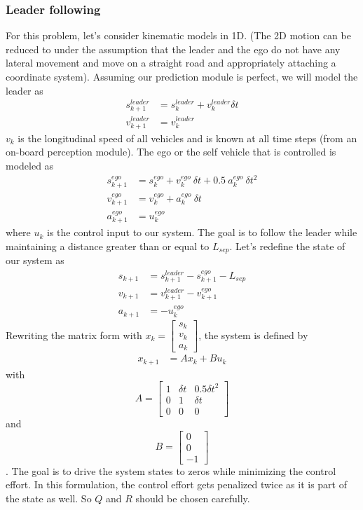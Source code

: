 \subsubsection{Leader following}
For this problem, let's consider kinematic models in 1D. (The 2D motion can be reduced to under the assumption that the leader and the ego do not have any lateral movement and move on a straight road and appropriately attaching a coordinate system). Assuming our prediction module is perfect, we will model the leader as
\begin{align}
    s_{k+1}^{leader} &= s_{k}^{leader} + v_{k}^{leader} \delta t \\
    v_{k+1}^{leader} &= v_{k}^{leader}
\end{align}
$v_{k}$ is the longitudinal speed of all vehicles and is known at all time steps (from an on-board perception module).
The ego or the self vehicle that is controlled is modeled as
\begin{align}
    s_{k+1}^{ego} &= s_{k}^{ego} + v_{k}^{ego}~\delta t + 0.5~a_{k}^{ego}~\delta t^2 \\
    v_{k+1}^{ego} &= v_{k}^{ego} + a_{k}^{ego}~\delta t \\
    a_{k+1}^{ego} &= u_{k}^{ego}
\end{align}
where $u_{k}$ is the control input to our system.
The goal is to follow the leader while maintaining a distance greater than or equal to $L_{sep}$. Let's redefine the state of our system as
\begin{align}
    s_{k+1} &= s_{k+1}^{leader} - s_{k+1}^{ego} - L_{sep} \\
    v_{k+1} &= v_{k+1}^{leader} - v_{k+1}^{ego} \\
    a_{k+1} &=  - u_{k}^{ego} 
\end{align}
Rewriting the matrix form with $x_{k}=\begin{bmatrix}s_{k} \\ v_{k} \\ a_{k}\end{bmatrix}$, the system is defined by
\begin{align}
    x_{k+1} &= Ax_{k} + Bu_{k}
\end{align}
with $$A=\begin{bmatrix}1 & \delta t & 0.5\delta t^2 \\ 0 & 1 & \delta t \\ 0 & 0 & 0 \end{bmatrix}$$ and $$B=\begin{bmatrix} 0 \\ 0\\ -1 \end{bmatrix}$$. The goal is to drive the system states to zeros while minimizing the control effort. In this formulation, the control effort gets penalized twice as it is part of the state as well. So $Q$ and $R$ should be chosen carefully.

